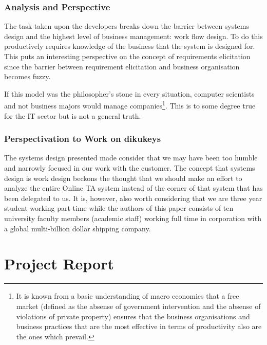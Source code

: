 \documentclass[11pt,a4paper]{report}
\begin{document}
\subsection{Analysis and Perspective}
The task taken upon the developers breaks down the barrier between systems design and the highest level of business management: work flow design. To do this productively requires knowledge of the business that the system is designed for. This puts an interesting perspective on the concept of requirements elicitation since the barrier between requirement elicitation and business organisation becomes fuzzy.

If this model was the philosopher's stone in every situation, computer scientists and not business majors would manage companies\footnote{It is known from a basic understanding of macro economics that a free market (defined as the absense of government intervention and the absense of violations of private property) ensures that the business organisations and business practices that are the most effective in terms of productivity also are the ones which prevail.}. This is to some degree true for the IT sector but is not a general truth. 
\subsection{Perspectivation to Work on dikukeys}
The systems design presented made consider that we may have been too humble and narrowly focused in our work with the customer. The concept that systems design is work design beckons the thought that we should make an effort to analyze the entire Online TA system instead of the corner of that system that has been delegated to us. It is, however, also worth considering that we are three  year student working part-time while the authors of this paper consists of ten university faculty members (academic staff) working full time in corporation with a global multi-billion dollar shipping company.


\chapter{Project Report}\label{ch:Project_Report}
\end{document}
